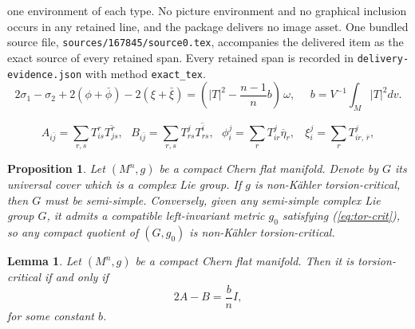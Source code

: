 \documentclass[10pt,a4paper]{amsart}
\theoremstyle{plain}
\newtheorem{lemma}{Lemma}
\newtheorem{proposition}{Proposition}
\theoremstyle{remark}
\begin{document}
one environment of each type. No picture environment and no graphical inclusion occurs in any retained line, and the package delivers no image asset. One bundled source file, \texttt{sources/167845/source0.tex}, accompanies the delivered item as the exact source of every retained span. Every retained span is recorded in \texttt{delivery-evidence.json} with method \texttt{exact\_tex}.
\begin{equation} \label{eq:tor-crit}
2\sigma_1 - \sigma_2 +2(\phi + \bar{\phi}) - 2 (\xi + \bar{\xi}) = (|T|^2-\frac{n-1}{n}b)\, \omega, \ \ \ \ \ \ b=V^{-1}\int_M|T|^2dv.
\end{equation}

\begin{equation} \label{eq:AB}
A_{i\bar{j}} = \sum_{r,s}T^r_{is}\overline{T^r_{js}}, \ \ \ B_{i\bar{j}} = \sum_{r,s}T^j_{rs}\overline{T^i_{rs}}, \ \ \ \phi_{i}^j = \sum_r T^j_{ir} \overline{\eta}_r, \ \ \ \ \xi_{i}^j = \sum_r T^j_{ir,\,\bar{r}} ,
\end{equation}

\begin{proposition}  \label{prop1}
Let $(M^n,g)$ be a compact Chern flat manifold. Denote by $G$ its universal cover which is a complex Lie group. If $g$ is non-K\"ahler torsion-critical, then $G$ must be semi-simple. Conversely, given any semi-simple complex Lie group $G$, it admits a compatible left-invariant metric $g_0$ satisfying (\ref{eq:tor-crit}), so any compact quotient of $(G,g_0)$ is non-K\"ahler torsion-critical.  
\end{proposition}

\begin{lemma} \label{lemma1}
Let $(M^n,g)$ be a compact Chern flat manifold. Then it is torsion-critical if and only if 
\begin{equation} \label{eq:6}
2A - B = \frac{b}{n}I,
\end{equation} 
for some constant $b$. 
\end{lemma} 
\end{document}

